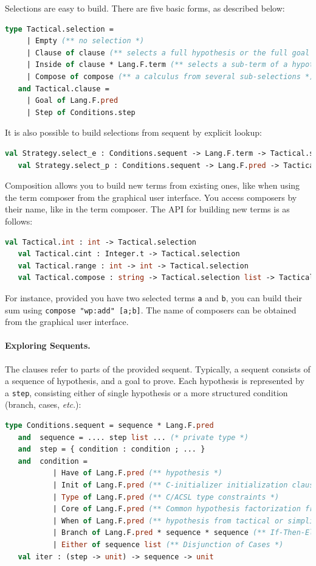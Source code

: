 Selections are easy to build. There are five basic forms, as described below:
\begin{lstlisting}[language=ocaml]
   type Tactical.selection =
     | Empty (** no selection *)
     | Clause of clause (** selects a full hypothesis or the full goal *)
     | Inside of clause * Lang.F.term (** selects a sub-term of a hypothesis or goal *)
     | Compose of compose (** a calculus from several sub-selections *)
   and Tactical.clause =
     | Goal of Lang.F.pred
     | Step of Conditions.step
\end{lstlisting}

It is also possible to build selections from sequent by explicit lookup:
\begin{lstlisting}[language=ocaml]
   val Strategy.select_e : Conditions.sequent -> Lang.F.term -> Tactical.selection
   val Strategy.select_p : Conditions.sequent -> Lang.F.pred -> Tactical.selection
\end{lstlisting}

Composition allows you to build new terms from existing ones, like when using the term composer from the graphical user interface. You access composers by their name, like in the term composer. The API for building new terms is as follows:
\begin{lstlisting}[language=ocaml]
   val Tactical.int : int -> Tactical.selection
   val Tactical.cint : Integer.t -> Tactical.selection
   val Tactical.range : int -> int -> Tactical.selection
   val Tactical.compose : string -> Tactical.selection list -> Tactical.selection
\end{lstlisting}

For instance, provided you have two selected terms \lstinline$a$ and \lstinline$b$, you can build their sum using
\lstinline$compose "wp:add" [a;b]$. The name of composers can be obtained from the graphical user interface.

\paragraph{Exploring Sequents.}
The clauses refer to parts of the provided sequent. Typically, a sequent consists of a
sequence of hypothesis, and a goal to prove. Each hypothesis is represented by a \lstinline$step$, consisting either of single hypothesis or a more structured condition
(branch, cases, \textit{etc}.):

\begin{lstlisting}[language=ocaml]
   type Conditions.sequent = sequence * Lang.F.pred
   and  sequence = .... step list ... (* private type *)
   and  step = { condition : condition ; ... }
   and  condition =
           | Have of Lang.F.pred (** hypothesis *)
           | Init of Lang.F.pred (** C-initializer initialization clause *)
           | Type of Lang.F.pred (** C/ACSL type constraints *)
           | Core of Lang.F.pred (** Common hypothesis factorization from WP *)
           | When of Lang.F.pred (** hypothesis from tactical or simplification *)
           | Branch of Lang.F.pred * sequence * sequence (** If-Then-Else *)
           | Either of sequence list (** Disjunction of Cases *)
   val iter : (step -> unit) -> sequence -> unit
\end{lstlisting}

